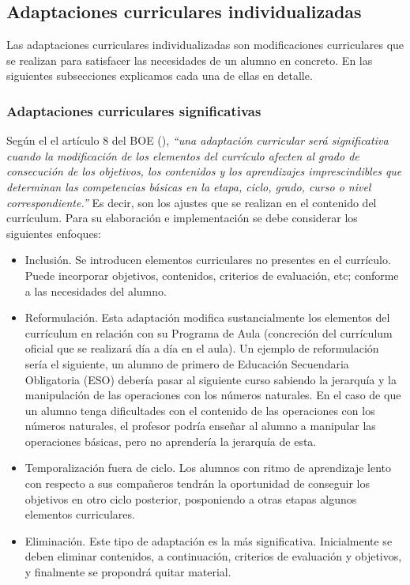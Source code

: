 \subsection{Adaptaciones curriculares individualizadas}

Las adaptaciones curriculares individualizadas son modificaciones curriculares que se realizan para satisfacer las necesidades de un alumno en concreto. En las siguientes subsecciones explicamos cada una de ellas en detalle.

\subsubsection{Adaptaciones curriculares significativas}
Según el el artículo 8 del BOE (\citeyear[p. 7]{BOE}), \textit{``una adaptación curricular será significativa cuando la modificación de los elementos del currículo afecten al grado de consecución de los objetivos, los contenidos y los aprendizajes imprescindibles que determinan las competencias básicas en la etapa, ciclo, grado, curso o nivel correspondiente.''} Es decir, son los ajustes que se realizan en el contenido del currículum. Para su elaboración e implementación se debe considerar los siguientes enfoques:
\begin{itemize}
    \item Inclusión. Se introducen elementos curriculares no presentes en el currículo. Puede incorporar objetivos, contenidos, criterios de evaluación, etc; conforme a las necesidades del alumno.
    \item Reformulación. Esta adaptación modifica sustancialmente los elementos del currículum en relación con su Programa de Aula (concreción del currículum oficial que se realizará día a día en el aula). Un ejemplo de reformulación sería el siguiente, un alumno de primero de Educación Secuendaria Obligatoria (ESO) debería pasar al siguiente curso sabiendo la jerarquía y la manipulación de las operaciones con los números naturales. En el caso de que un alumno tenga dificultades con el contenido de las operaciones con los números naturales, el profesor podría enseñar al alumno a manipular las operaciones básicas, pero no aprendería la jerarquía de esta.

    \item Temporalización fuera de ciclo. Los alumnos con ritmo de aprendizaje lento con respecto a sus compañeros tendrán la oportunidad de conseguir los objetivos en otro ciclo posterior, posponiendo a otras etapas algunos elementos curriculares.
    \item Eliminación. Este tipo de adaptación es la más significativa. Inicialmente se deben eliminar contenidos, a continuación, criterios de evaluación y objetivos, y finalmente se propondrá quitar material.
\end{itemize}

